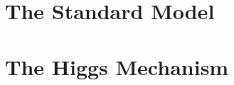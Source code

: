 \section{The Standard Model}\label{sec:standard-model}
\section{The Higgs Mechanism}\label{sec:sm-higgs}

